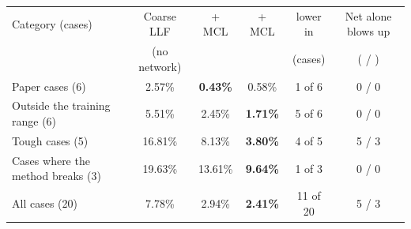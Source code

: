 \begin{tabular}{@{}lccccc@{}}
\toprule
Category (cases) & Coarse LLF & \paper{} + MCL & \ours{} + MCL & \ours{} lower in & Net alone blows up \\
 & (no network) & & & (cases) & (\paper{} / \ours{}) \\ \midrule
Paper cases (6) & 2.57\% & \textbf{0.43\%} & 0.58\% & 1 of 6 & 0 / 0 \\
Outside the training range (6) & 5.51\% & 2.45\% & \textbf{1.71\%} & 5 of 6 & 0 / 0 \\
Tough cases (5) & 16.81\% & 8.13\% & \textbf{3.80\%} & 4 of 5 & 5 / 3 \\
Cases where the method breaks (3) & 19.63\% & 13.61\% & \textbf{9.64\%} & 1 of 3 & 0 / 0 \\
\midrule
All cases (20) & 7.78\% & 2.94\% & \textbf{2.41\%} & 11 of 20 & 5 / 3 \\
\bottomrule
\end{tabular}
